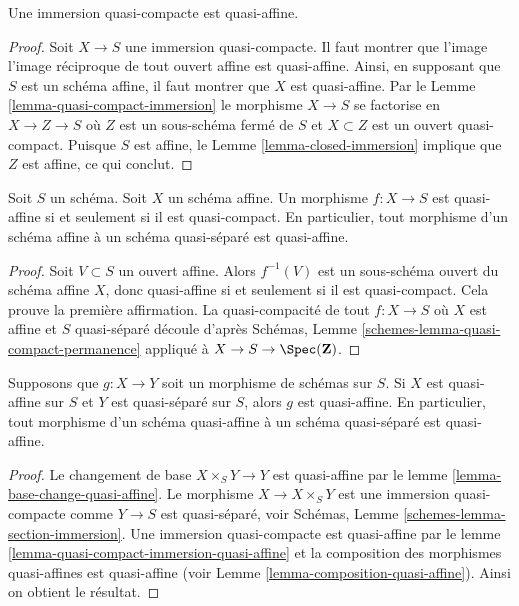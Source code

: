 \begin{lemma}
\label{lemma-quasi-compact-immersion-quasi-affine}
Une immersion quasi-compacte est quasi-affine.
\end{lemma}

\begin{proof}
Soit $X \to S$ une immersion quasi-compacte. Il faut montrer que l'image
l'image réciproque de tout ouvert affine est quasi-affine. Ainsi, en
supposant que $S$ est un schéma affine, il faut
montrer que $X$ est quasi-affine. Par le Lemme \ref{lemma-quasi-compact-immersion} le morphisme
$X \to S$ se factorise en $X \to Z \to S$ où $Z$ est un sous-schéma fermé
de $S$ et $X \subset Z$ est un ouvert quasi-compact. Puisque
$S$ est affine, le Lemme \ref{lemma-closed-immersion} implique que $Z$ est
affine, ce qui conclut.
\end{proof}

\begin{lemma}
\label{lemma-affine-quasi-affine}
Soit $S$ un schéma. Soit $X$ un schéma affine.
Un morphisme $f : X \to S$ est quasi-affine si et seulement si il est quasi-compact.
En particulier, tout morphisme d'un schéma affine à un schéma quasi-séparé
est quasi-affine.
\end{lemma}

\begin{proof}
Soit $V \subset S$ un ouvert affine. Alors $f^{-1}(V)$ est un sous-schéma
ouvert du schéma affine $X$, donc quasi-affine si et
seulement si il est quasi-compact. Cela prouve la première affirmation.
La quasi-compacité de tout $f : X \to S$ où $X$ est affine
et $S$ quasi-séparé découle d'après Schémas, Lemme
\ref{schemes-lemma-quasi-compact-permanence} appliqué à $X \to S \to \Spec(\mathbf{Z})$.
\end{proof}

\begin{lemma}
\label{lemma-quasi-affine-permanence}
Supposons que $g : X \to Y$ soit un morphisme de schémas sur $S$.
Si $X$ est quasi-affine sur $S$ et $Y$ est quasi-séparé sur
$S$, alors $g$ est quasi-affine. En particulier, tout morphisme
d'un schéma quasi-affine à un schéma quasi-séparé est quasi-affine.
\end{lemma}

\begin{proof}
Le changement de base $X \times_S Y \to Y$ est quasi-affine
par le lemme \ref{lemma-base-change-quasi-affine}. Le morphisme
$X \to X \times_S Y$ est une immersion
quasi-compacte comme $Y \to S$ est quasi-séparé,
voir Schémas, Lemme \ref{schemes-lemma-section-immersion}. Une
immersion quasi-compacte est quasi-affine
par le lemme \ref{lemma-quasi-compact-immersion-quasi-affine} et la composition
des morphismes quasi-affines est quasi-affine
(voir Lemme \ref{lemma-composition-quasi-affine}). Ainsi on obtient le résultat.
\end{proof}











